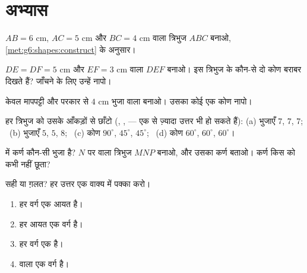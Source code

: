 \section{अभ्यास}

\begin{exercise}[$\star$]\label{exo:g6:shapes:1}
$AB = 6$ cm, $AC = 5$ cm और $BC = 4$ cm वाला त्रिभुज $ABC$
बनाओ, \cref{met:g6:shapes:construct} के अनुसार।
\end{exercise}

\begin{exercise}[$\star$]\label{exo:g6:shapes:2}
$DE = DF = 5$ cm और $EF = 3$ cm वाला  $DEF$
बनाओ। इस त्रिभुज के कौन-से दो कोण बराबर दिखते हैं? जाँचने के लिए
उन्हें नापो।
\end{exercise}

\begin{exercise}[$\star$]\label{exo:g6:shapes:3}
केवल मापपट्टी और परकार से $4$ cm भुजा वाला  बनाओ।
उसका कोई एक कोण नापो।
\end{exercise}

\begin{exercise}[$\star$]\label{exo:g6:shapes:4}
हर त्रिभुज को उसके आँकड़ों से छाँटो (, ,
 --- एक से ज़्यादा उत्तर भी हो सकते हैं):
(a) भुजाएँ $7$, $7$, $7$; \
(b) भुजाएँ $5$, $5$, $8$; \
(c) कोण $90^\circ$, $45^\circ$, $45^\circ$; \
(d) कोण $60^\circ$, $60^\circ$, $60^\circ$।
\end{exercise}

\begin{exercise}[$\star$]\label{exo:g6:shapes:5}
 में कर्ण कौन-सी भुजा है? $N$ पर  वाला
त्रिभुज $MNP$ बनाओ, और उसका कर्ण बताओ। कर्ण किस  को कभी
नहीं छूता?
\end{exercise}

\begin{exercise}[$\star$]\label{exo:g6:shapes:6}
सही या ग़लत? हर उत्तर एक वाक्य में पक्का करो।
\begin{enumerate}
  \item हर वर्ग एक आयत है।
  \item हर आयत एक वर्ग है।
  \item हर वर्ग एक  है।
  \item {} वाला  एक वर्ग है।
\end{enumerate}
\end{exercise}

